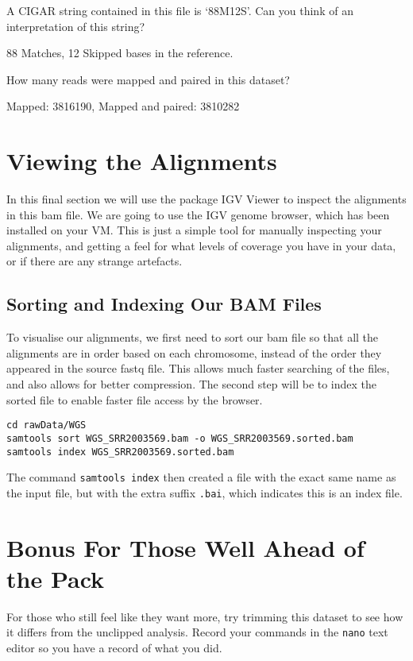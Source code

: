 \begin{questions}
A CIGAR string contained in this file is `88M12S'.
Can you think of an interpretation of this string? \\
\begin{answer}
88 Matches, 12 Skipped bases in the reference.
\end{answer}
How many reads were mapped and paired in this dataset?
\begin{answer}
Mapped: 3816190, Mapped and paired: 3810282
\end{answer}
\end{questions}

\section{Viewing the Alignments}
In this final section we will use the package IGV Viewer to inspect the alignments in this bam file.
We are going to use the IGV genome browser, which has been installed on your VM.
This is just a simple tool for manually inspecting your alignments, and getting a feel for what levels of coverage you have in your data, or if there are any strange artefacts.

\subsection{Sorting and Indexing Our BAM Files}
\begin{note}
To visualise our alignments, we first need to sort our bam file so that all the alignments are in order based on each chromosome, instead of the order they appeared in the source fastq file.
This allows much faster searching of the files, and also allows for better compression.
The second step will be to index the sorted file to enable faster file access by the browser.
\end{note}

\begin{steps}
\begin{lstlisting}
cd rawData/WGS
samtools sort WGS_SRR2003569.bam -o WGS_SRR2003569.sorted.bam
samtools index WGS_SRR2003569.sorted.bam
\end{lstlisting}
\end{steps}

The command \texttt{samtools index} then created a file with the exact same name as the input file, but with the extra suffix \texttt{.bai}, which indicates this is an index file.\\


\section{Bonus For Those Well Ahead of the Pack}
\begin{advanced}
For those who still feel like they want more, try trimming this dataset to see how it differs from the unclipped analysis.
Record your commands in the \texttt{nano} text editor so you have a record of what you did.
\end{advanced}
